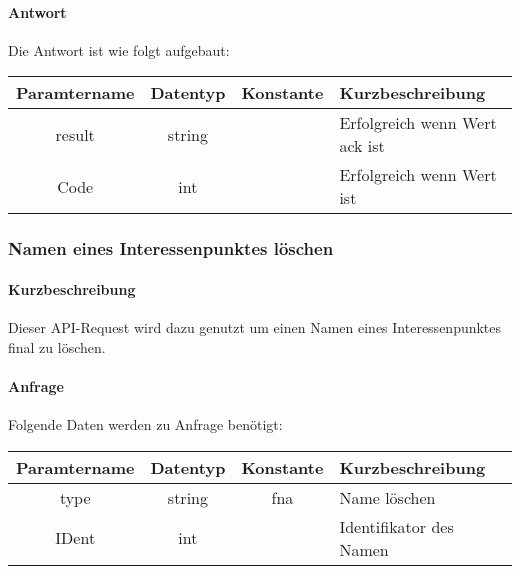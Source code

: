 \paragraph{Antwort}Die Antwort ist wie folgt aufgebaut:
\begin{table}[H]
	\begin{tabular}{|c|c|c|p{6.5cm}|}
		\hline
		\textbf{Paramtername} & \textbf{Datentyp} & \textbf{Konstante} & \textbf{Kurzbeschreibung}                                                                                               \\ \hline
		result              & string           &                 & Erfolgreich wenn Wert {\glqq ack\grqq} ist \\ \hline
		Code                & int              &                 & Erfolgreich wenn Wert {\glqq 0\grqq} ist \\ \hline
	\end{tabular}
\end{table}
\subsubsection{Namen eines Interessenpunktes löschen}
\paragraph{Kurzbeschreibung}Dieser API-Request wird dazu genutzt um einen Namen eines Interessenpunktes final zu löschen.
\paragraph{Anfrage}Folgende Daten werden zu Anfrage benötigt:
\begin{table}[H]
	\begin{tabular}{|c|c|c|p{6.5cm}|}
		\hline
		\textbf{Paramtername} & \textbf{Datentyp} & \textbf{Konstante} & \textbf{Kurzbeschreibung}                                                                                               \\ \hline
		type                & string            & fna                & Name löschen \\ \hline
		IDent               & int               &                    & Identifikator des Namen \\ \hline
	\end{tabular}
\end{table}
